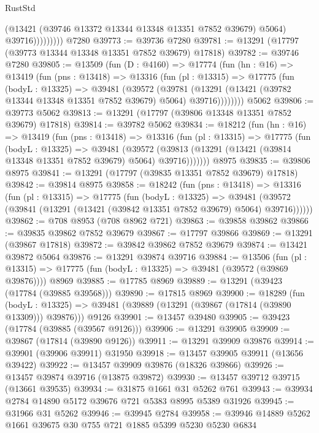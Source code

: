 \begin{lexlean}{RustStd}
\begin{coremodule}
                      (@13421 (@39746 @13372 @13344 @13348 @13351 @7852 @39679) @5064)
                      @39716)))))))))
    @7280
@39773 := @39736 @7280
@39781 := @13291 (@17797 (@39773 @13344 @13348 @13351 @7852 @39679) @17818)
@39782 := @39746 @7280
@39805 := @13509
    (fun (D : @4160) =>
    @17774
      (fun (hn : @16) =>
      @13419
        (fun (pns : @13418) =>
        @13316
          (fun (pl : @13315) =>
          @17775
            (fun (bodyL : @13325) =>
            @39481
              (@39572
                (@39781
                  (@13291 (@13421 (@39782 @13344 @13348 @13351 @7852 @39679) @5064) @39716))))))))
    @5062
@39806 := @39773 @5062
@39813 := @13291 (@17797 (@39806 @13348 @13351 @7852 @39679) @17818)
@39814 := @39782 @5062
@39834 := @18212
    (fun (hn : @16) =>
    @13419
      (fun (pns : @13418) =>
      @13316
        (fun (pl : @13315) =>
        @17775
          (fun (bodyL : @13325) =>
          @39481
            (@39572 (@39813 (@13291 (@13421 (@39814 @13348 @13351 @7852 @39679) @5064) @39716)))))))
    @8975
@39835 := @39806 @8975
@39841 := @13291 (@17797 (@39835 @13351 @7852 @39679) @17818)
@39842 := @39814 @8975
@39858 := @18242
    (fun (pns : @13418) =>
    @13316
      (fun (pl : @13315) =>
      @17775
        (fun (bodyL : @13325) =>
        @39481 (@39572 (@39841 (@13291 (@13421 (@39842 @13351 @7852 @39679) @5064) @39716))))))
@39862 := @708 @8953 (@708 @8962 @721)
@39863 := @39858 @39862
@39866 := @39835 @39862 @7852 @39679
@39867 := @17797 @39866
@39869 := @13291 (@39867 @17818)
@39872 := @39842 @39862 @7852 @39679
@39874 := @13421 @39872 @5064
@39876 := @13291 @39874 @39716
@39884 := @13506
    (fun (pl : @13315) => @17775 (fun (bodyL : @13325) => @39481 (@39572 (@39869 @39876))))
    @8969
@39885 := @17785 @8969
@39889 := @13291 (@39423 (@17784 (@39885 @39568)))
@39890 := @17815 @8969
@39900 := @18289
    (fun (bodyL : @13325) => @39481 (@39889 (@13291 (@39867 (@17814 (@39890 @13309))) @39876)))
    @9126
@39901 := @13457 @39480
@39905 := @39423 (@17784 (@39885 (@39567 @9126)))
@39906 := @13291 @39905
@39909 := @39867 (@17814 (@39890 @9126))
@39911 := @13291 @39909 @39876
@39914 := @39901 (@39906 @39911) @31950
@39918 := @13457 @39905 @39911 (@13656 @39422)
@39922 := @13457 @39909 @39876 (@18326 @39866)
@39926 := @13457 @39874 @39716 (@13875 @39872)
@39930 := @13457 @39712 @39715 (@13661 @39535)
@39934 := @31875 @1661 @31 @5262 @761
@39943 := @39934 @2784 @14890 @5172 @39676 @721 @5383 @8995 @5389 @31926
@39945 := @31966 @31 @5262
@39946 := @39945 @2784
@39958 := @39946 @14889 @5262 @1661 @39675 @30 @755 @721 @1885 @5399 @5230 @5230 @6834

\end{coremodule}
\end{lexlean}
